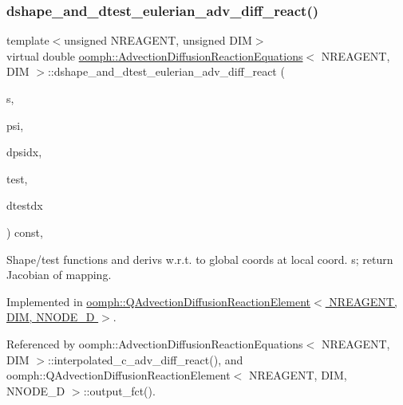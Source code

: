 \subsubsection{\texorpdfstring{dshape\+\_\+and\+\_\+dtest\+\_\+eulerian\+\_\+adv\+\_\+diff\+\_\+react()}{dshape\_and\_dtest\_eulerian\_adv\_diff\_react()}}
{\footnotesize\ttfamily template$<$unsigned N\+R\+E\+A\+G\+E\+NT, unsigned D\+IM$>$ \\
virtual double \hyperlink{classoomph_1_1AdvectionDiffusionReactionEquations}{oomph\+::\+Advection\+Diffusion\+Reaction\+Equations}$<$ N\+R\+E\+A\+G\+E\+NT, D\+IM $>$\+::dshape\+\_\+and\+\_\+dtest\+\_\+eulerian\+\_\+adv\+\_\+diff\+\_\+react (\begin{DoxyParamCaption}\item[{const \hyperlink{classoomph_1_1Vector}{Vector}$<$ double $>$ \&}]{s,  }\item[{\hyperlink{classoomph_1_1Shape}{Shape} \&}]{psi,  }\item[{\hyperlink{classoomph_1_1DShape}{D\+Shape} \&}]{dpsidx,  }\item[{\hyperlink{classoomph_1_1Shape}{Shape} \&}]{test,  }\item[{\hyperlink{classoomph_1_1DShape}{D\+Shape} \&}]{dtestdx }\end{DoxyParamCaption}) const\hspace{0.3cm}{\ttfamily [protected]}, {}}



Shape/test functions and derivs w.\+r.\+t. to global coords at local coord. s; return Jacobian of mapping. 



Implemented in \hyperlink{classoomph_1_1QAdvectionDiffusionReactionElement_acb2af6c72ae97ffe0c762c9df692c3ab}{oomph\+::\+Q\+Advection\+Diffusion\+Reaction\+Element$<$ N\+R\+E\+A\+G\+E\+N\+T, D\+I\+M, N\+N\+O\+D\+E\+\_\+D $>$}.



Referenced by oomph\+::\+Advection\+Diffusion\+Reaction\+Equations$<$ N\+R\+E\+A\+G\+E\+N\+T, D\+I\+M $>$\+::interpolated\+\_\+c\+\_\+adv\+\_\+diff\+\_\+react(), and oomph\+::\+Q\+Advection\+Diffusion\+Reaction\+Element$<$ N\+R\+E\+A\+G\+E\+N\+T, D\+I\+M, N\+N\+O\+D\+E\+\_\+D $>$\+::output\+\_\+fct().

\mbox{\label{classoomph_1_1AdvectionDiffusionReactionEquations_acd01ced36610cb5e69ee359df778ba09}} 
